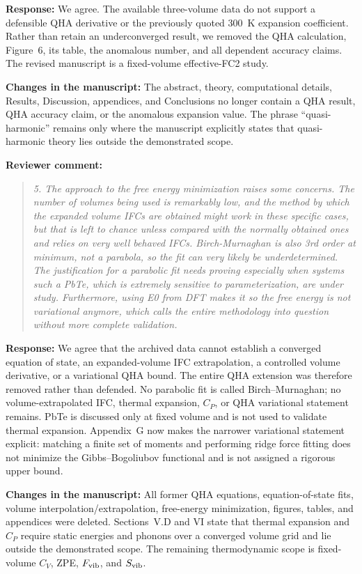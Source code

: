 \documentclass[11pt]{article}
\newcommand{\Question}[1]{\par\medskip\noindent\textbf{Reviewer comment:}\par\begin{quote}\itshape #1\end{quote}}
\newcommand{\Answer}[1]{\par\noindent\color{black}\normalfont\textbf{Response:} #1\par\smallskip}
\newcommand{\Change}[1]{\par\noindent\color{revisionblue}\normalfont\textbf{Changes in the manuscript:} #1\par\color{black}\medskip}
\begin{document}
\Answer{We agree. The available three-volume data do not support a defensible QHA derivative or the previously quoted 300~K expansion coefficient. Rather than retain an underconverged result, we removed the QHA calculation, Figure~6, its table, the anomalous number, and all dependent accuracy claims. The revised manuscript is a fixed-volume effective-FC2 study.}

\Change{The abstract, theory, computational details, Results, Discussion, appendices, and Conclusions no longer contain a QHA result, QHA accuracy claim, or the anomalous expansion value. The phrase ``quasi-harmonic'' remains only where the manuscript explicitly states that quasi-harmonic theory lies outside the demonstrated scope.}

\Question{5. The approach to the free energy minimization raises some concerns. The number of volumes being used is remarkably low, and the method by which the expanded volume IFCs are obtained might work in these specific cases, but that is left to chance unless compared with the normally obtained ones and relies on very well behaved IFCs. Birch-Murnaghan is also 3rd order at minimum, not a parabola, so the fit can very likely be underdetermined. The justification for a parabolic fit needs proving especially when systems such a PbTe, which is extremely sensitive to parameterization, are under study. Furthermore, using E0 from DFT makes it so the free energy is not variational anymore, which calls the entire methodology into question without more complete validation.}

\Answer{We agree that the archived data cannot establish a converged equation of state, an expanded-volume IFC extrapolation, a controlled volume derivative, or a variational QHA bound. The entire QHA extension was therefore removed rather than defended. No parabolic fit is called Birch--Murnaghan; no volume-extrapolated IFC, thermal expansion, $C_P$, or QHA variational statement remains. PbTe is discussed only at fixed volume and is not used to validate thermal expansion. Appendix~G now makes the narrower variational statement explicit: matching a finite set of moments and performing ridge force fitting does not minimize the Gibbs--Bogoliubov functional and is not assigned a rigorous upper bound.}

\Change{All former QHA equations, equation-of-state fits, volume interpolation/extrapolation, free-energy minimization, figures, tables, and appendices were deleted. Sections~V.D and VI state that thermal expansion and $C_P$ require static energies and phonons over a converged volume grid and lie outside the demonstrated scope. The remaining thermodynamic scope is fixed-volume $C_V$, ZPE, $F_{\rm vib}$, and $S_{\rm vib}$.}
\end{document}
